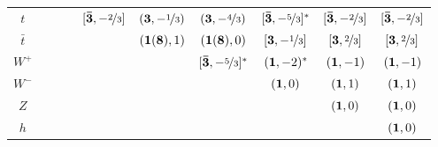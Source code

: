 \begin{table}
\begin{center}
\begin{adjustbox}{width=1\textwidth}
\begin{tabular}{cccccccccc}
$t$ & & &  & $[\mathbf{\bar 3}, -\nicefrac{2}{3}]$ & $(\mathbf{3}, -\nicefrac{1}{3})$ & $(\mathbf{3}, -\nicefrac{4}{3})$& $[\mathbf{\bar 3}, -\nicefrac{5}{3}]^*$ & $[\mathbf{\bar 3}, -\nicefrac{2}{3}]$ & $[\mathbf{\bar 3}, -\nicefrac{2}{3}]$  \\  
$\bar t$ & & & & & $(\mathbf{1(8)}, 1)$ & $(\mathbf{1(8)}, 0)$ & $[\mathbf{3}, -\nicefrac{1}{3}]$ & $[\mathbf{3}, \nicefrac{2}{3}]$& $[\mathbf{3}, \nicefrac{2}{3}]$  \\ 
$W^+$ & & &  & & & $[\mathbf{\bar 3}, -\nicefrac{5}{3}]^*$ & $(\mathbf{1}, -2)^*$ & $(\mathbf{1}, -1)$ & $(\mathbf{1}, -1)$ \\ 
$W^-$ & & & & & & & $(\mathbf{1}, 0)$& $(\mathbf{1}, 1)$& $(\mathbf{1}, 1)$  \\ 
$Z$ & & & & & & & & $(\mathbf{1}, 0)$ & $(\mathbf{1}, 0)$  \\  
$h$ & & & & & & & & & $(\mathbf{1}, 0)$  \\  \hline\hline

\end{tabular}
\label{default}

\end{adjustbox}

\end{center}
\end{table}



